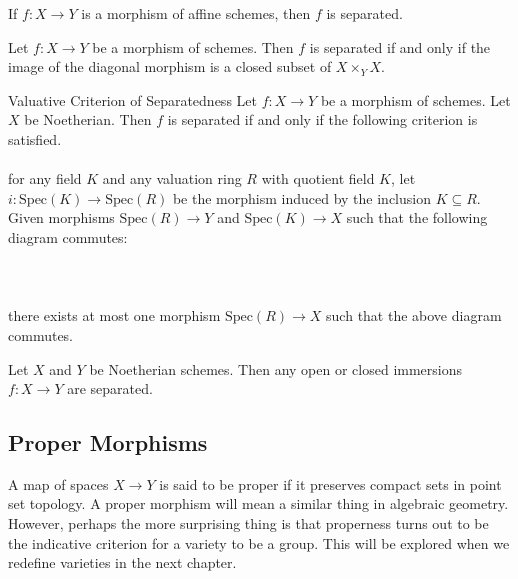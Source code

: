 \documentclass[a4paper]{article}
\begin{document}
\begin{prp}{}{} If $f:X\to Y$ is a morphism of affine schemes, then $f$ is separated. 
\end{prp}

\begin{prp}{}{} Let $f:X\to Y$ be a morphism of schemes. Then $f$ is separated if and only if the image of the diagonal morphism is a closed subset of $X\times_Y X$. 
\end{prp}

\begin{thm}{Valuative Criterion of Separatedness}{} Let $f:X\to Y$ be a morphism of schemes. Let $X$ be Noetherian. Then $f$ is separated if and only if the following criterion is satisfied. \\~\\

for any field $K$ and any valuation ring $R$ with quotient field $K$, let $i:\text{Spec}(K)\to\text{Spec}(R)$ be the morphism induced by the inclusion $K\subseteq R$. Given morphisms $\text{Spec}(R)\to Y$ and $\text{Spec}(K)\to X$ such that the following diagram commutes: \\~\\
 \\~\\
there exists at most one morphism $\text{Spec}(R)\to X$ such that the above diagram commutes. 
\end{thm}

\begin{prp}{}{} Let $X$ and $Y$ be Noetherian schemes. Then any open or closed immersions $f:X\to Y$ are separated. 
\end{prp}

\subsection{Proper Morphisms}
A map of spaces $X\to Y$ is said to be proper if it preserves compact sets in point set topology. A proper morphism will mean a similar thing in algebraic geometry. However, perhaps the more surprising thing is that properness turns out to be the indicative criterion for a variety to be a group. This will be explored when we redefine varieties in the next chapter. 
\end{document}
